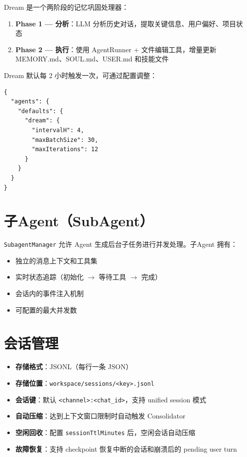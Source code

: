 \documentclass[12pt,a4paper,UTF8]{ctexart}
\begin{document}
Dream 是一个两阶段的记忆巩固处理器：
\begin{enumerate}
    \item \textbf{Phase 1 — 分析}：LLM 分析历史对话，提取关键信息、用户偏好、项目状态
    \item \textbf{Phase 2 — 执行}：使用 AgentRunner + 文件编辑工具，增量更新 MEMORY.md、SOUL.md、USER.md 和技能文件
\end{enumerate}

Dream 默认每 2 小时触发一次，可通过配置调整：
\begin{verbatim}
{
  "agents": {
    "defaults": {
      "dream": {
        "intervalH": 4,
        "maxBatchSize": 30,
        "maxIterations": 12
      }
    }
  }
}
\end{verbatim}

\section{子Agent（SubAgent）}

\texttt{SubagentManager} 允许 Agent 生成后台子任务进行并发处理。子Agent 拥有：
\begin{itemize}
    \item 独立的消息上下文和工具集
    \item 实时状态追踪（初始化 $\rightarrow$ 等待工具 $\rightarrow$ 完成）
    \item 会话内的事件注入机制
    \item 可配置的最大并发数
\end{itemize}

\section{会话管理}

\begin{itemize}
    \item \textbf{存储格式}：JSONL（每行一条 JSON）
    \item \textbf{存储位置}：\texttt{workspace/sessions/<key>.jsonl}
    \item \textbf{会话键}：默认 \texttt{<channel>:<chat\_id>}，支持 unified session 模式
    \item \textbf{自动压缩}：达到上下文窗口限制时自动触发 Consolidator
    \item \textbf{空闲回收}：配置 \texttt{sessionTtlMinutes} 后，空闲会话自动压缩
    \item \textbf{故障恢复}：支持 checkpoint 恢复中断的会话和崩溃后的 pending user turn
\end{itemize}
\end{document}
